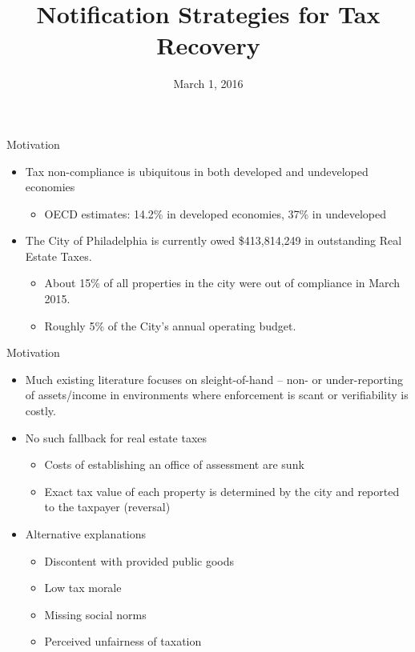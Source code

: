 \documentclass[ignorenonframetext,]{beamer}
\title{Notification Strategies for Tax Recovery}
\author{Michael Chirico\footnote<.->{The research presented here was supported
  in part by the Institute of Education Sciences, U.S. Department of
  Education, through Grant \#R305B090015 to the University of
  Pennsylvania. The opinions expressed are those of the presenter and do
  not represent the views of the Institute or the U.S. Department of
  Education.}, Robert Inman, Charles Loeffler, John MacDonald, Holger
Sieg}
\date{March 1, 2016}
\providecommand{\tightlist}{%
  \setlength{\itemsep}{0pt}\setlength{\parskip}{0pt}}
\begin{document}
\frame{\titlepage}

\begin{frame}{Motivation}

\begin{itemize}
\item
  Tax non-compliance is ubiquitous in both developed and undeveloped
  economies

  \begin{itemize}
  \tightlist
  \item
    OECD estimates: 14.2\% in developed economies, 37\% in undeveloped
  \end{itemize}
\item
  The City of Philadelphia is currently owed \$413,814,249 in
  outstanding Real Estate Taxes.

  \begin{itemize}
  \item
    About 15\% of all properties in the city were out of compliance in
    March 2015.
  \item
    Roughly 5\% of the City's annual operating budget.
  \end{itemize}
\end{itemize}

\end{frame}

\begin{frame}{Motivation}

\begin{itemize}
\item
  Much existing literature focuses on sleight-of-hand -- non- or
  under-reporting of assets/income in environments where enforcement is
  scant or verifiability is costly.
\item
  No such fallback for real estate taxes

  \begin{itemize}
  \item
    Costs of establishing an office of assessment are sunk
  \item
    Exact tax value of each property is determined by the city and
    reported to the taxpayer (reversal)
  \end{itemize}
\item
  Alternative explanations

  \begin{itemize}
  \item
    Discontent with provided public goods
  \item
    Low tax morale
  \item
    Missing social norms
  \item
    Perceived unfairness of taxation
  \end{itemize}
\end{itemize}

\end{frame}
\end{document}

